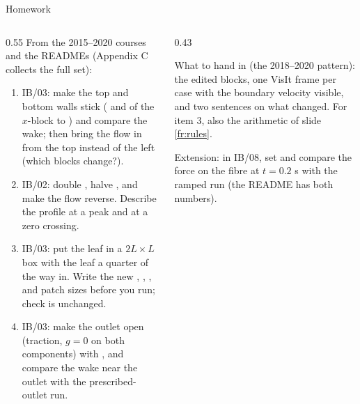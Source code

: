 \documentclass[aspectratio=169,11pt]{beamer}
\begin{document}
\begin{frame}{Homework}
\label{fr:hw}
\begin{columns}[T,onlytextwidth]
\begin{column}{0.55\textwidth}
\footnotesize From the 2015--2020 courses and the READMEs (Appendix C collects the full set):
\begin{enumerate}
  \item IB/03: make the top and bottom walls stick ( and  of the $x$-block to ) and compare the wake; then bring the flow in from the top instead of the left (which blocks change?).
  \item IB/02: double , halve , and make the flow reverse. Describe the profile at a peak and at a zero crossing.
  \item IB/03: put the leaf in a $2L \times L$ box with the leaf a quarter of the way in. Write the new , , ,  and patch sizes before you run; check  is unchanged.
  \item IB/03: make the outlet open (traction, $g = 0$ on both components) with , and compare the wake near the outlet with the prescribed-outlet run.
\end{enumerate}
\end{column}
\begin{column}{0.43\textwidth}
\begin{punchbox}
\small What to hand in (the 2018--2020 pattern): the edited blocks, one VisIt frame per case with the boundary velocity visible, and two sentences on what changed. For item 3, also the arithmetic of slide \ref{fr:rules}.
\end{punchbox}
\vspace{2mm}
\small Extension: in IB/08, set  and compare the force on the fibre at $t = 0.2$ s with the ramped run (the README has both numbers).
\end{column}
\end{columns}
\end{frame}
\end{document}
